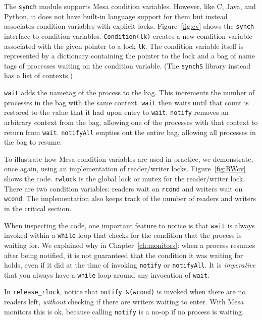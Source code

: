 \documentclass{report}
\begin{document}
The \texttt{synch} module supports Mesa condition variables.  However, like C, Java, and Python,
it does not have built-in language support for them but instead associates condition variables
with explicit locks.
Figure~\ref{fig:cv} shows the \texttt{synch} interface to condition variables.
\texttt{Condition(lk)} creates a new condition variable associated with the given pointer
to a lock \texttt{lk}.
The condition variable itself is represented by a dictionary containing the pointer to the lock
and a bag of name tags of processes waiting on the condition variable.
(The \texttt{synchS} library instead has a list of contexts.)

\texttt{wait} adds the nametag of the process to the bag.  This increments the number of processes
in the bag with the same context.  \texttt{wait} then waits until that count is restored to the
value that it had upon entry to \texttt{wait}.  \texttt{notify} removes an arbitrary context from
the bag, allowing one of the processes with that context to return from \texttt{wait}.
\texttt{notifyAll} empties out the entire bag, allowing all processes in the bag to resume.

To illustrate how Mesa condition variables are used in practice, we demonstrate, once again,
using an implementation of reader/writer locks.
Figure~\ref{fig:RWcv} shows the code.  \texttt{rwlock} is the global lock or mutex for the
reader/writer lock.  There are two condition variables: readers wait on \texttt{rcond} and
writers wait on \texttt{wcond}.  The implementation also keeps track of the number of
readers and writers in the critical section.

When inspecting the code, one important feature to notice is that \texttt{wait} is always
invoked within a \texttt{while} loop that checks for the condition that the process is
waiting for.  We explained why in Chapter~\ref{ch:monitors}: when a process resumes after
being notified, it is not guaranteed that the condition it was waiting for holds, even
if it did at the time of invoking \texttt{notify} or \texttt{notifyAll}.
It is \emph{imperative} that you always have a \texttt{while} loop around any invocation
of \texttt{wait}.

In \texttt{release\_rlock}, notice that \texttt{notify \&(wcond)} is invoked when there
are no readers left, \emph{without} checking if there are writers waiting to enter.
With Mesa monitors this is ok, because calling \texttt{notify} is a no-op if no process
is waiting.
\end{document}
